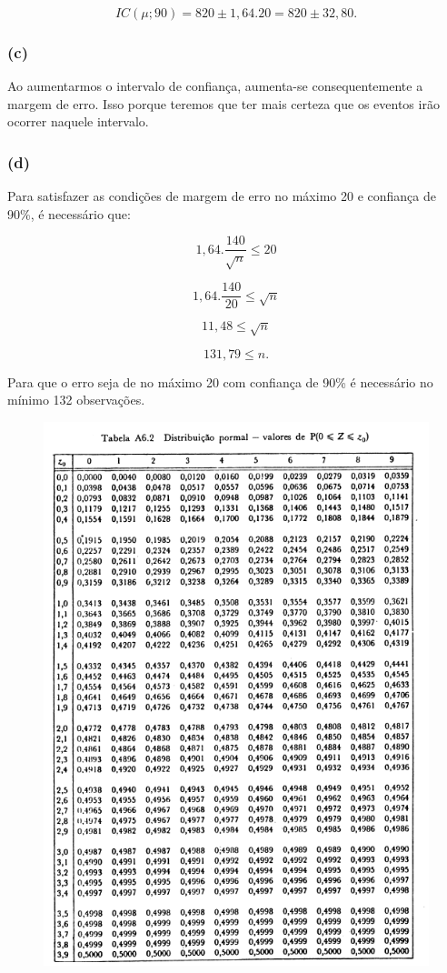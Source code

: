 \documentclass[hidelinks,11pt]{book}
\theoremstyle{definition}
\begin{document}
\begin{displaymath}
	IC(\mu;90) = 820 \pm 1,64.20 = 820 \pm 32,80.
\end{displaymath}

	\subsubsection{(c)}

Ao aumentarmos o intervalo de confiança, aumenta-se consequentemente a margem de erro. Isso porque teremos que ter mais certeza que os eventos irão ocorrer naquele intervalo.


	\subsubsection{(d)}

Para satisfazer as condições de margem de erro no máximo 20 e confiança de 90\%, é necessário que:

\begin{displaymath}
	1,64.\frac{140}{\sqrt{n}} \leq 20
\end{displaymath}


\begin{displaymath}
	1,64.\frac{140}{20} \leq \sqrt{n}
\end{displaymath}

\begin{displaymath}
	11,48 \leq \sqrt{n}
\end{displaymath}

\begin{displaymath}
	131,79 \leq n.
\end{displaymath}

Para que o erro seja de no máximo 20 com confiança de 90\% é necessário no mínimo 132 observações.

\clearpage


\begin{figure}[H]
	\centering
	\includegraphics[width=0.7\linewidth]{tabela}
	\caption{}
	\label{fig:tabela}
\end{figure}








	
	
\end{document}
